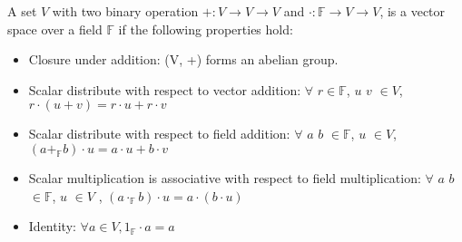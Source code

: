  

\begin{definition}
A set $V$ with two binary operation $+ : V \rightarrow V \rightarrow V$ and $\cdot : \mathbb{F}  \rightarrow V \rightarrow V$, 
is  a vector space over a field $\mathbb{F}$ if the following properties hold:
\end{definition} 
\begin{itemize}
 \item Closure under addition: (V, +) forms an abelian group. 
 \item Scalar  distribute  with respect  to  vector  addition: $\forall$  $r \in \mathbb{F}$, $u$ $v$ $\in V$,  $r \cdot (u + v) = r \cdot u + r \cdot v$
 \item Scalar distribute with respect to field addition: 
                $\forall$  $a$ $b$ $\in \mathbb{F}$, $u$ $\in V$, $(a +_{\mathbb{F}} b) \cdot u = a \cdot u + b \cdot v$
  \item Scalar multiplication is associative with respect to field multiplication:
         $\forall$ $a$ $b$ $\in  \mathbb{F}$, $u$ $\in V$ , $(a \cdot_{\mathbb{F}} b) \cdot u = a \cdot (b \cdot u)$
  \item Identity: $\forall a \in V, 1_{\mathbb{F}} \cdot a = a$

\end{itemize}

 
% 

